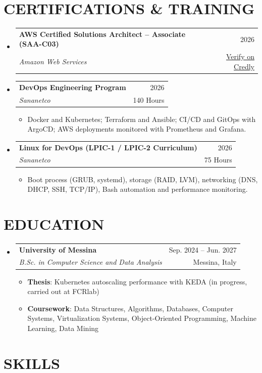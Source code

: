 \documentclass[a4paper,11pt]{article}
\makeatletter
\newcommand{\resumeItem}[1]{
  \item\small{
    {#1 \vspace{-2pt}}
  }
}
\newcommand{\resumeSubheading}[4]{
  \vspace{-1pt}\item
    \begin{tabular*}{\textwidth}[t]{l@{\extracolsep{\fill}}r}
      \textbf{#1} & {\color{dark-grey}\small #2}\vspace{1pt}\\ %
      \textit{#3} & {\color{dark-grey} \small #4}\\ %
    \end{tabular*}\vspace{-7pt}
}
\newcommand{\resumeSubHeadingListStart}{\begin{itemize}[leftmargin=0in, label={}]}
\newcommand{\resumeSubHeadingListEnd}{\end{itemize}}
\newcommand{\resumeItemListStart}{\begin{itemize}[itemsep=-2pt, topsep=2pt]}
\newcommand{\resumeItemListEnd}{\end{itemize}\vspace{-6pt}}
\makeatother
\begin{document}
\section{CERTIFICATIONS \& TRAINING}
  \resumeSubHeadingListStart
\resumeSubheading
      {AWS Certified Solutions Architect -- Associate (SAA-C03)}{2026}
      {Amazon Web Services}{\href{https://www.credly.com/badges/5af1083b-ebf2-4efe-803c-9bf532299f92}{Verify on Credly}}
      \vspace{2pt}
\resumeSubheading
      {DevOps Engineering Program}{2026}
      {Sananetco}{140 Hours}
      \resumeItemListStart
        \resumeItem{Docker and Kubernetes; Terraform and Ansible; CI/CD and GitOps with ArgoCD; AWS deployments monitored with Prometheus and Grafana.}
\resumeItemListEnd
\resumeSubheading
      {Linux for DevOps (LPIC-1 / LPIC-2 Curriculum)}{2026}
      {Sananetco}{75 Hours}
      \resumeItemListStart
        \resumeItem{Boot process (GRUB, systemd), storage (RAID, LVM), networking (DNS, DHCP, SSH, TCP/IP), Bash automation and performance monitoring.}
\resumeItemListEnd
  \resumeSubHeadingListEnd

\section {EDUCATION}
  \resumeSubHeadingListStart
    \resumeSubheading
      {University of Messina}{Sep. 2024 -- Jun. 2027}
      {B.Sc. in Computer Science and Data Analysis}{Messina, Italy}
      	\resumeItemListStart
        \resumeItem{\textbf{Thesis}: Kubernetes autoscaling performance with KEDA (in progress, carried out at FCRlab)}
    	\resumeItem{\textbf{Coursework}: Data Structures, Algorithms, Databases, Computer Systems, Virtualization Systems, Object-Oriented Programming, Machine Learning, Data Mining}
\resumeItemListEnd
  \resumeSubHeadingListEnd

\section{SKILLS}
\end{document}
